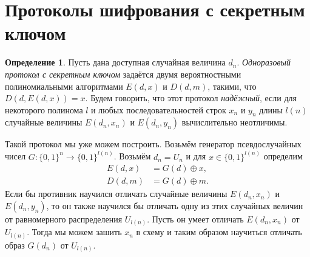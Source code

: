 \documentclass[12pt,a4paper]{article}
\newcommand{\bits}{\{0,1\}}
\theoremstyle{definition}
\newtheorem{definition}{Определение}[section]
\theoremstyle{plain}
\theoremstyle{remark}
\begin{document}
\section{Протоколы шифрования с секретным ключом}
\begin{definition}
Пусть дана доступная случайная величина $d_n$. \emph{Одноразовый протокол с секретным ключом} задаётся двумя вероятностными полиномиальными алгоритмами
$E(d,x)$ и $D(d, m)$, такими, что $D(d, E(d, x)) = x$.
Будем говорить, что этот протокол \emph{надёжный}, если для некоторого полинома $l$ и любых последовательностей строк $x_n$ и $y_n$ длины $l(n)$ случайные величины $E(d_n, x_n)$ и $E(d_n, y_n)$ вычислительно неотличимы.
\end{definition}

Такой протокол мы уже можем построить. Возьмём генератор псевдослучайных чисел $G: \bits^n\to\bits^{l(n)}$.
Возьмём $d_n = U_n$ и для $x\in\bits^{l(n)}$ определим 
$$
\begin{aligned}
E(d, x) &= G(d) \oplus x,\\ D(d, m) &= G(d) \oplus m.
\end{aligned}
$$
Если бы противник научился отличать случайные величины $E(d_n, x_n)$ и $E(d_n, y_n)$, то 
он также научился бы отличать одну из этих случайных величин от равномерного распределения
$U_{l(n)}$. Пусть он умеет отличать $E(d_n, x_n)$ от $U_{l(n)}$. Тогда мы можем зашить $x_n$ в схему 
и таким образом научиться отличать образ $G(d_n)$ от $U_{l(n)}$.
\end{document}
